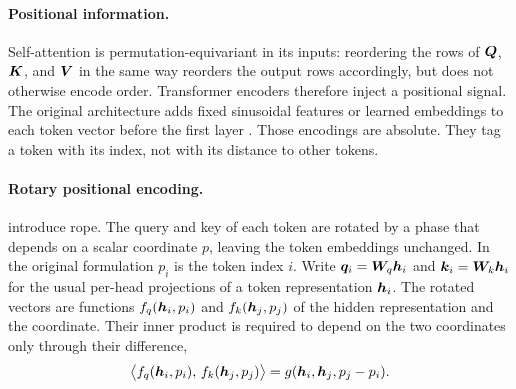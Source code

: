 \paragraph{Positional information.}
Self-attention is permutation-equivariant in its inputs: reordering the rows of $\bm{Q}$, $\bm{K}$, and $\bm{V}$ in the same way reorders the output rows accordingly, but does not otherwise encode order.
Transformer encoders therefore inject a positional signal. The original architecture adds fixed sinusoidal features or learned embeddings to each token vector before the first layer \parencite{vaswani2017attention,devlin2019bert}.
Those encodings are absolute. They tag a token with its index, not with its distance to other tokens.

\paragraph{Rotary positional encoding.}
\textcite{su2024roformer} introduce \gls{rope}. The query and key of each token are rotated by a phase that depends on a scalar coordinate $p$, leaving the token embeddings unchanged.
In the original formulation $p_i$ is the token index $i$. Write $\bm{q}_i = \bm{W}_q\bm{h}_i$ and $\bm{k}_i = \bm{W}_k\bm{h}_i$ for the usual per-head projections of a token representation $\bm{h}_i$. The rotated vectors are functions $f_q(\bm{h}_i, p_i)$ and $f_k(\bm{h}_j, p_j)$ of the hidden representation and the coordinate. Their inner product is required to depend on the two coordinates only through their difference,
\begin{equation}\label{eq:bg:rope_goal}
  \bigl\langle f_q(\bm{h}_i, p_i),\, f_k(\bm{h}_j, p_j) \bigr\rangle
  = g(\bm{h}_i, \bm{h}_j, p_j - p_i).
\end{equation}

